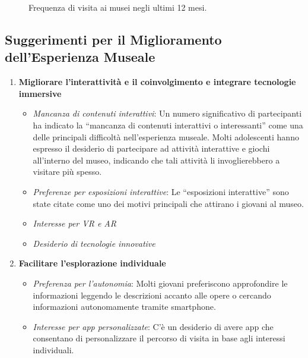 \documentclass{article}
\begin{document}
\begin{figure}[h]
    \centering
    \caption{Frequenza di visita ai musei negli ultimi 12 mesi.}
\end{figure}
\newpage

\subsection{Suggerimenti per il Miglioramento dell'Esperienza Museale}

\begin{enumerate}
    \item \textbf{Migliorare l'interattività e il coinvolgimento e integrare tecnologie immersive}
        \begin{itemize}
            \item \textit{Mancanza di contenuti interattivi}: Un numero significativo di partecipanti ha indicato la ``mancanza di contenuti interattivi o interessanti'' come una delle principali difficoltà nell'esperienza museale. Molti adolescenti hanno espresso il desiderio di partecipare ad attività interattive e giochi all'interno del museo, indicando che tali attività li invoglierebbero a visitare più spesso.
            \item \textit{Preferenze per esposizioni interattive}: Le ``esposizioni interattive'' sono state citate come uno dei motivi principali che attirano i giovani al museo.
            \item \textit{Interesse per VR e AR}
            \item \textit{Desiderio di tecnologie innovative}
        \end{itemize}

    \item \textbf{Facilitare l'esplorazione individuale}
        \begin{itemize}
            \item \textit{Preferenza per l'autonomia}: Molti giovani preferiscono approfondire le informazioni leggendo le descrizioni accanto alle opere o cercando informazioni autonomamente tramite smartphone.
            \item \textit{Interesse per app personalizzate}: C'è un desiderio di avere app che consentano di personalizzare il percorso di visita in base agli interessi individuali.
        \end{itemize}


\end{enumerate}
\end{document}
